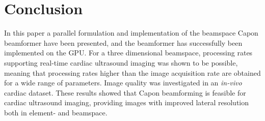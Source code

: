 \documentclass[journal]{IEEEtran}
\begin{document}
\section{Conclusion}\label{sec:con}
In this paper a parallel formulation and implementation of the beamspace Capon beamformer have been presented, and
the beamformer has successfully been implemented on the GPU. For a three dimensional beamspace, processing rates supporting real-time cardiac ultrasound imaging was shown to be possible, meaning that processing rates higher than the image acquisition rate are obtained for a wide range of parameters. Image quality was investigated in an \textit{in-vivo} cardiac dataset. These results showed that Capon beamforming is feasible for cardiac ultrasound imaging, providing images with improved lateral resolution both in element- and beamspace.




%
%
\end{document}

